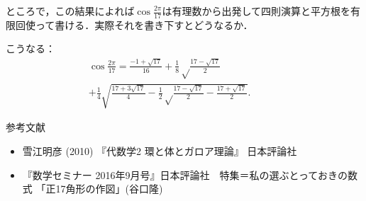 \documentclass[dvipdfmx,17pt]{beamer}
\theoremstyle{plain}
\begin{document}
\begin{frame}
ところで，この結果によれば$\cos \frac{2 \pi}{17}$は有理数から出発して四則演算と平方根を有限回使って書ける．実際それを書き下すとどうなるか．
\end{frame}

\begin{frame}
こうなる：
{\small 
\begin{align*}
\cos \frac{2 \pi}{17} = \frac{-1+\sqrt{17}}{16}+\frac{1}{8}\sqrt \frac{17-\sqrt {17}}{2}\qquad\qquad\qquad\\
+\frac{1}{4}\sqrt{\frac{17+3\sqrt{17}}{4}-\frac{1}{2}\sqrt \frac{17-\sqrt {17}}{2}-\frac{17+\sqrt {17}}{2}}.
\end{align*}}
\end{frame}

\begin{frame}{参考文献}

\begin{itemize}
\item 雪江明彦 (2010) 『代数学2 環と体とガロア理論』 日本評論社
\item 『数学セミナー 2016年9月号』日本評論社　特集＝私の選ぶとっておきの数式 「正17角形の作図」(谷口隆)
\end{itemize}
\end{frame}
\end{document}
